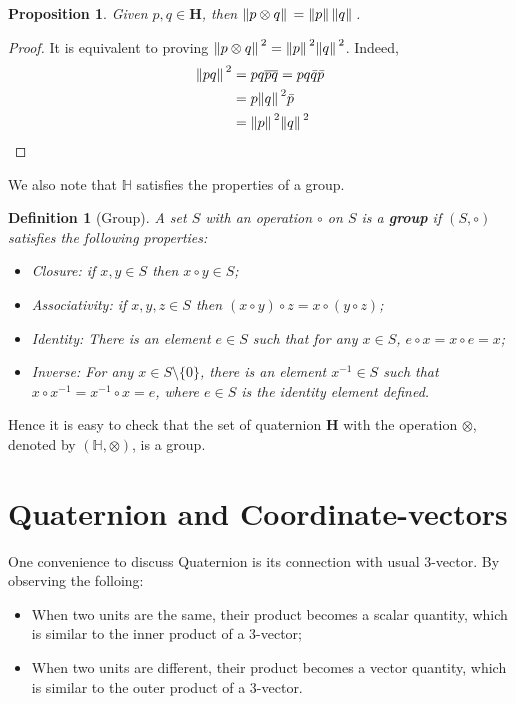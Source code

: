 \documentclass[12pt]{article}
\newtheorem*{definition}{Definition}
\newtheorem*{proposition}{Proposition}
\begin{document}
    \begin{proposition}
        Given $p,q\in\mathbf{H}$, then $\norm*{p\otimes q}=\norm*{p}\norm*{q}$.
    \end{proposition}

    \begin{proof}
        It is equivalent to proving $\norm*{p\otimes q}^2=\norm*{p}^2\norm*{q}^2$. Indeed, \begin{align*}
            \norm*{pq}^2&=pq\overline{pq}=pq\bar{q}\bar{p}\\
            &=p\norm*{q}^2\bar{p}\\
            &=\norm*{p}^2\norm*{q}^2
        \end{align*}
    \end{proof}

    We also note that $\mathbb{H}$ satisfies the properties of a group.

    \begin{definition}[Group]
        A set $S$ with an operation $\circ$ on $S$ is a \textbf{group} if $(S,\circ)$ satisfies the following properties: \begin{itemize}
            \item Closure: if $x,y\in S$ then $x\circ y\in S$;
            \item Associativity: if $x,y,z\in S$ then $(x\circ y)\circ z = x\circ (y\circ z)$;
            \item Identity: There is an element $e\in S$ such that for any $x\in S$, $e\circ x=x\circ e=x$;
            \item Inverse: For any $x\in S\setminus\{0\}$, there is an element $x^{-1}\in S$ such that $x\circ x^{-1}=x^{-1}\circ x= e$, where $e\in S$ is the identity element defined.
        \end{itemize}
    \end{definition}

    Hence it is easy to check that the set of quaternion $\mathbf{H}$ with the operation $\otimes$, denoted by $(\mathbb{H},\otimes)$, is a group.

    \section{Quaternion and Coordinate-vectors}

    One convenience to discuss Quaternion is its connection with usual 3-vector. By observing the folloing: \begin{itemize}
        \item When two units are the same, their product becomes a scalar quantity, which is similar to the inner product of a 3-vector;
        \item When two units are different, their product becomes a vector quantity, which is similar to the outer product of a 3-vector.
    \end{itemize}
\end{document}
